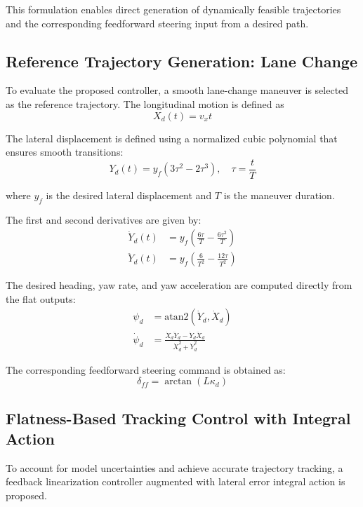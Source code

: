 \documentclass[letterpaper]{ifacconf}
\begin{document}
This formulation enables direct generation of dynamically feasible trajectories and the corresponding feedforward steering input from a desired path.

\subsection{Reference Trajectory Generation: Lane Change}

To evaluate the proposed controller, a smooth lane-change maneuver is selected as the reference trajectory. The longitudinal motion is defined as
\begin{equation}
X_d(t) = v_x t
\end{equation}

The lateral displacement is defined using a normalized cubic polynomial that ensures smooth transitions:
\begin{equation}
Y_d(t) = y_f \left(3\tau^2 - 2\tau^3\right), \quad \tau = \frac{t}{T}
\end{equation}

where $y_f$ is the desired lateral displacement and $T$ is the maneuver duration.

The first and second derivatives are given by:
\begin{align}
\dot{Y}_d(t) &= y_f \left(\frac{6\tau}{T} - \frac{6\tau^2}{T}\right) \\
\ddot{Y}_d(t) &= y_f \left(\frac{6}{T^2} - \frac{12\tau}{T^2}\right)
\end{align}

The desired heading, yaw rate, and yaw acceleration are computed directly from the flat outputs:
\begin{align}
\psi_d &= \text{atan2}(\dot{Y}_d, \dot{X}_d) \\
\dot{\psi}_d &= \frac{\dot{X}_d \ddot{Y}_d - \dot{Y}_d \ddot{X}_d}{\dot{X}_d^2 + \dot{Y}_d^2}
\end{align}

The corresponding feedforward steering command is obtained as:
\begin{equation}
\delta_{ff} = \arctan(L \kappa_d)
\end{equation}


\subsection{Flatness-Based Tracking Control with Integral Action}

To account for model uncertainties and achieve accurate trajectory tracking, a feedback linearization controller augmented with lateral error integral action is proposed.
\end{document}
